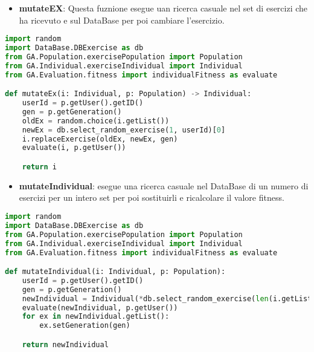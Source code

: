 \documentclass{article}
\begin{document}
\begin{itemize}
\item\textbf{mutateEX}: Questa fuznione esegue uan ricerca casuale nel set di esercizi che ha ricevuto e sul DataBase per poi cambiare l'esercizio.
\end{itemize}

\begin{lstlisting}[language=Python, breaklines, no caption]
import random
import DataBase.DBExercise as db
from GA.Population.exercisePopulation import Population
from GA.Individual.exerciseIndividual import Individual
from GA.Evaluation.fitness import individualFitness as evaluate

def mutateEx(i: Individual, p: Population) -> Individual:
    userId = p.getUser().getID()
    gen = p.getGeneration()
    oldEx = random.choice(i.getList())
    newEx = db.select_random_exercise(1, userId)[0]
    i.replaceExercise(oldEx, newEx, gen)
    evaluate(i, p.getUser())

    return i
\end{lstlisting}

\pagebreak

\begin{itemize}
\item\textbf{mutateIndividual}: esegue una ricerca casuale nel DataBase di un numero di esercizi per un intero set per poi sostituirli e ricalcolare il valore fitness.
\end{itemize}

\begin{lstlisting}[language=Python, breaklines, no caption]
import random
import DataBase.DBExercise as db
from GA.Population.exercisePopulation import Population
from GA.Individual.exerciseIndividual import Individual
from GA.Evaluation.fitness import individualFitness as evaluate

def mutateIndividual(i: Individual, p: Population):
    userId = p.getUser().getID()
    gen = p.getGeneration()
    newIndividual = Individual(*db.select_random_exercise(len(i.getList()), userId))
    evaluate(newIndividual, p.getUser())
    for ex in newIndividual.getList():
        ex.setGeneration(gen)

    return newIndividual
\end{lstlisting}
\end{document}
